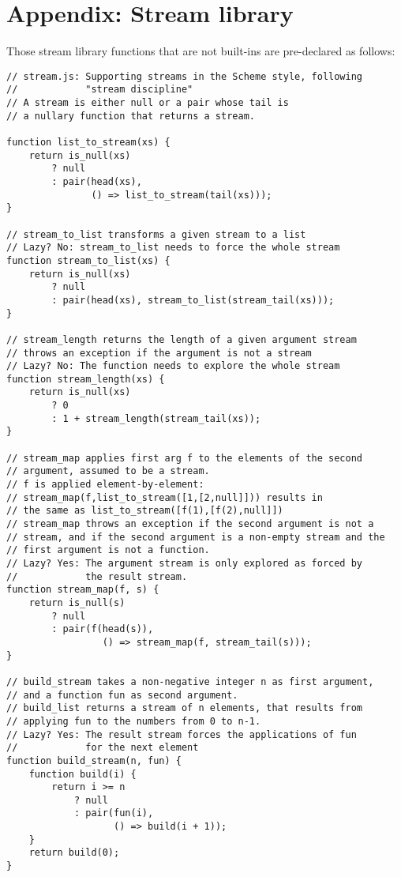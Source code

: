 \section*{Appendix: Stream library}

Those stream library functions that are not built-ins are pre-declared as follows:

\begin{lstlisting}
// stream.js: Supporting streams in the Scheme style, following
//            "stream discipline"
// A stream is either null or a pair whose tail is
// a nullary function that returns a stream.

function list_to_stream(xs) {
    return is_null(xs)
        ? null
        : pair(head(xs), 
               () => list_to_stream(tail(xs))); 
}

// stream_to_list transforms a given stream to a list
// Lazy? No: stream_to_list needs to force the whole stream
function stream_to_list(xs) {
    return is_null(xs)
        ? null
        : pair(head(xs), stream_to_list(stream_tail(xs)));
}

// stream_length returns the length of a given argument stream
// throws an exception if the argument is not a stream
// Lazy? No: The function needs to explore the whole stream
function stream_length(xs) {
    return is_null(xs)
        ? 0
        : 1 + stream_length(stream_tail(xs));
}

// stream_map applies first arg f to the elements of the second
// argument, assumed to be a stream.
// f is applied element-by-element:
// stream_map(f,list_to_stream([1,[2,null]])) results in
// the same as list_to_stream([f(1),[f(2),null]])
// stream_map throws an exception if the second argument is not a
// stream, and if the second argument is a non-empty stream and the
// first argument is not a function.
// Lazy? Yes: The argument stream is only explored as forced by
//            the result stream.
function stream_map(f, s) {
    return is_null(s)
        ? null
        : pair(f(head(s)), 
                 () => stream_map(f, stream_tail(s)));
}

// build_stream takes a non-negative integer n as first argument,
// and a function fun as second argument.
// build_list returns a stream of n elements, that results from
// applying fun to the numbers from 0 to n-1.
// Lazy? Yes: The result stream forces the applications of fun
//            for the next element
function build_stream(n, fun) {
    function build(i) {
        return i >= n
            ? null
            : pair(fun(i), 
                   () => build(i + 1)); 
    }
    return build(0);
}


\end{lstlisting}
